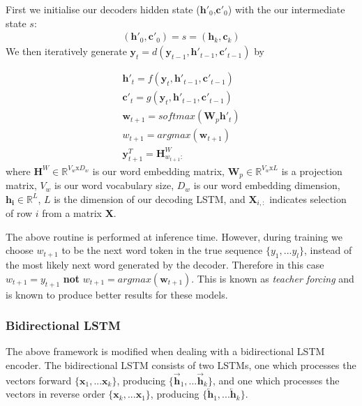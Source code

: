 First we initialise our decoders hidden state ($\textbf{h}'_0$,$\textbf{c}'_0$) with the our intermediate state $s$:
\begin{align}
    (\textbf{h}'_0, \textbf{c}'_0) = s = (\textbf{h}_k, \textbf{c}_k) \label{eq:s2s_assign}
\end{align}
We then iteratively generate $\textbf{y}_t = d(\mathbf{y}_{t-1}, \mathbf{h}'_{t-1},\mathbf{c}'_{t-1} ) $ by 

\begin{align}
    \textbf{h}'_t = f(\textbf{y}_t, \textbf{h}'_{t-1}, \textbf{c}'_{t-1}) \label{eq:s2syh}\\
    \textbf{c}'_t = g(\textbf{y}_t, \textbf{h}'_{t-1}, \textbf{c}'_{t-1}) \label{eq:s2syc} \\
    \textbf{w}_{t+1} = softmax(\textbf{W}_p\textbf{h}'_t) \label{eq:s2syw}  \\
    w_{t+1} = argmax(\textbf{w}_{t+1})  \\
    \textbf{y}^T_{t+1} = \textbf{H}^W_{w_{t+1}:}  
\end{align}
where $\textbf{H}^W \in \mathbb{R}^{V_w\text{x}D_w}$ is our word embedding matrix, 
$\textbf{W}_p \in \mathbb{R}^{V_w\text{x}L}$ is a projection matrix, $V_w$ is our word vocabulary size, 
$D_w$ is our word embedding dimension, 
$\mathbf{h_i} \in \mathbb{R}^L$,
$L$ is the dimension of our decoding LSTM,
and $\textbf{X}_{i,:}$ indicates selection of row $i$ from a matrix \textbf{X}.

The above routine is performed at inference time. However, during training we choose   $w_{t+1} $ to be the next word token  in the true sequence $\{y_1,...y_l\}$, instead of the most likely next word generated by the decoder. Therefore in this case $w_{t+1}  = y_{t+1}$ \textbf{not}  $w_{t+1} = argmax(\textbf{w}_{t+1})$. This is known as \textit{teacher forcing} and is known to produce better results for these models.

\subsubsection{Bidirectional LSTM}

The above framework is modified when dealing with a bidirectional LSTM encoder. The bidirectional LSTM consists of two LSTMs, one which processes the vectors forward $\{\textbf{x}_1,...\textbf{x}_k\}$, producing  $\{\overrightarrow{\textbf{h}}_1,...\overrightarrow{\textbf{h}}_k\}$, and one which processes the vectors in reverse order  $\{\textbf{x}_k,...\textbf{x}_1\}$, producing  $\{\overleftarrow{\textbf{h}}_1,...\overleftarrow{\textbf{h}}_k\}$.

